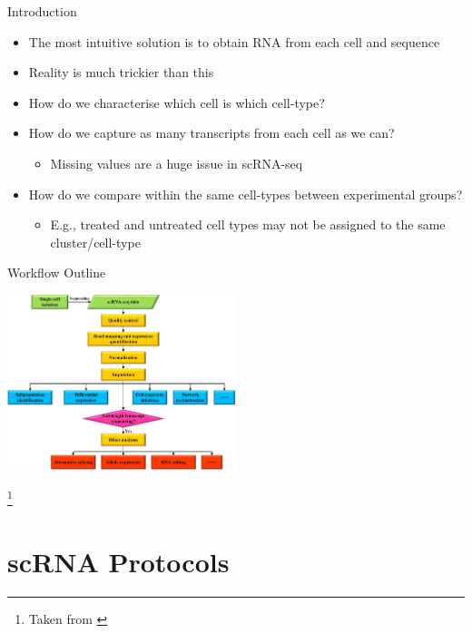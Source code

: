 \documentclass[aspectratio=169,11pt]{beamer}
\newcommand\blfootnote[1]{%
  \begingroup
  \renewcommand\thefootnote{}\footnote{#1}%
  \addtocounter{footnote}{-1}%
  \endgroup
}
\begin{document}
\begin{frame}{Introduction}

	\begin{itemize}
		\item The most intuitive solution is to obtain RNA from each cell and sequence
		\item Reality is much trickier than this
		\pause
		\item How do we characterise which cell is which cell-type?
		\item How do we capture as many transcripts from each cell as we can?
		\begin{itemize}
			\item Missing values are a huge issue in scRNA-seq
		\end{itemize}
		\item How do we compare within the same cell-types between experimental groups?
		\begin{itemize}
			\item E.g., treated and untreated cell types may not be assigned to the same cluster/cell-type
		\end{itemize}
	\end{itemize}

\end{frame}


\begin{frame}{Workflow Outline}

	\begin{center}
	\includegraphics[width=0.5\textwidth]{figures/scRNAWorkflow.jpg} 
	\end{center}
	
	\blfootnote{Taken from \cite{10.3389/fgene.2019.00317}}

\end{frame}

\section{scRNA Protocols}
\end{document}
